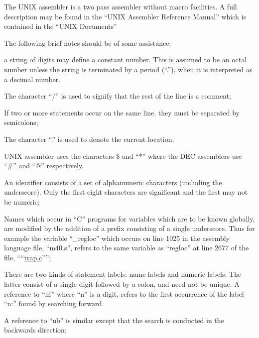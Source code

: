
The UNIX assembler is a two pass assembler
without macro facilities. A full
description may be found in the ``UNIX
Assembler Reference Manual'' which is
contained in the ``UNIX Documents''

The following brief notes should be of
some assistance:

\bd
\item[(a)] a string of digits may define a
constant number. This is assumed
to be an octal number unless the
string is terminated by a period
(``.''), when it is interpreted as
a decimal number.


\item[(b)] The character ``/'' is used to
signify that the rest of the
line is a comment;

\item[(c)] If two or more statements occur
on the same line, they must be
separated by semicolons;

\item[(d)] The character ``.'' is used to
denote the current location;

\item[(e)] UNIX assembler uses the characters \$
and ``*'' where the DEC
assemblers use ``\#'' and ``@''
respectively.

\item[(f)] An identifier consists of a set
of alphanumeric characters
(including the underscore).
Only the first eight characters
are significant and the first
may not be numeric;

\item[(g)] Names which occur in ``C'' programs
for variables which are to
be known globally, are modified
by the addition of a prefix consisting
of a single underscore.
Thus for example the variable
``\_regloc'' which occurs on line
1025 in the assembly language
file, ``m40.s'', refers to the
same variable as ``regloc'' at
line 2677 of the file, ````\href{./v6/ken/trap.c}{trap.c}'''';

\item[(h)] There are two kinds of statement
labels: name labels and numeric
labels. The latter consist of a
single digit followed by a
colon, and need not be unique.
A reference to ``nf'' where ``n'' is
a digit, refers to the first
occurrence of the label ``n:''
found by searching forward.

A reference to ``nb'' is similar
except that the search is conducted in
the backwards direction;

